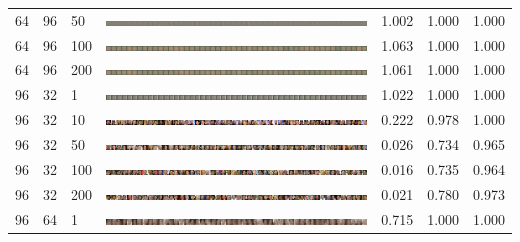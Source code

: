 \documentclass[a4paper]{article}
\begin{document}
\begin{table}[h!]
\begin{center}
{\begin{tabular}{lllcccc}
      64 & 96 & 50  & \includegraphics[width=\textwidth,trim={1536px 0 0 0},clip]{figures/faces_g64_d96_ep50_generator.jpg}   & 1.002 & 1.000 & 1.000\\
      64 & 96 & 100 & \includegraphics[width=\textwidth,trim={1536px 0 0 0},clip]{figures/faces_g64_d96_ep100_generator.jpg}  & 1.063 & 1.000 & 1.000\\
      64 & 96 & 200 & \includegraphics[width=\textwidth,trim={1536px 0 0 0},clip]{figures/faces_g64_d96_ep200_generator.jpg}  & 1.061 & 1.000 & 1.000\\
      \hline
      96 & 32 & 1   & \includegraphics[width=\textwidth,trim={1536px 0 0 0},clip]{figures/faces_g96_d32_ep1_generator.jpg}    & 1.022 & 1.000 & 1.000\\
      96 & 32 & 10  & \includegraphics[width=\textwidth,trim={1536px 0 0 0},clip]{figures/faces_g96_d32_ep10_generator.jpg}   & 0.222 & 0.978 & 1.000\\
      96 & 32 & 50  & \includegraphics[width=\textwidth,trim={1536px 0 0 0},clip]{figures/faces_g96_d32_ep50_generator.jpg}   & 0.026 & 0.734 & 0.965\\
      96 & 32 & 100 & \includegraphics[width=\textwidth,trim={1536px 0 0 0},clip]{figures/faces_g96_d32_ep100_generator.jpg}  & 0.016 & 0.735 & 0.964\\
      96 & 32 & 200 & \includegraphics[width=\textwidth,trim={1536px 0 0 0},clip]{figures/faces_g96_d32_ep200_generator.jpg}  & 0.021 & 0.780 & 0.973\\
      \hline
      96 & 64 & 1   & \includegraphics[width=\textwidth,trim={1536px 0 0 0},clip]{figures/faces_g96_d64_ep1_generator.jpg}    & 0.715 & 1.000 & 1.000\\

\end{tabular}}
\end{center}
\end{table}
\end{document}
